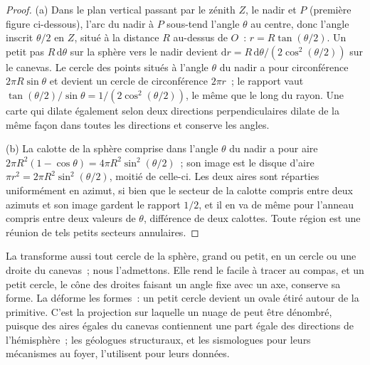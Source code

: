 \begin{proof}
(a) Dans le plan vertical passant par le zénith $Z$, le nadir et $P$
(première figure ci-dessous), l'arc du nadir à $P$
sous-tend l'angle $\theta$ au centre, donc l'angle inscrit
$\theta/2$ en $Z$, situé à la distance $R$ au-dessus de $O$~: $r =
R\tan(\theta/2)$. Un petit pas $R\,\mathrm d\theta$ sur la sphère vers le
nadir devient $\mathrm dr = R\,\mathrm d\theta/(2\cos^2(\theta/2))$ sur le
canevas. Le cercle des points situés à l'angle $\theta$ du nadir a
pour circonférence $2\pi R\sin\theta$ et devient un cercle de circonférence $2\pi
r$~; le rapport vaut $\tan(\theta/2)/\sin\theta = 1/(2\cos^2(\theta/2))$, le même
que le long du rayon. Une carte qui dilate également selon deux directions perpendiculaires
dilate de la même façon dans toutes les directions et conserve les angles.

(b) La calotte de la sphère comprise dans l'angle $\theta$ du nadir a pour aire
$2\pi R^2(1 - \cos\theta) = 4\pi R^2\sin^2(\theta/2)$~; son image est le disque
d'aire $\pi r^2 = 2\pi R^2\sin^2(\theta/2)$, moitié de celle-ci. Les deux aires sont
réparties uniformément en azimut, si bien que le secteur de la calotte compris entre deux azimuts
et son image gardent le rapport $1/2$, et il en va de même pour l'anneau compris entre deux valeurs
de $\theta$, différence de deux calottes. Toute région est une réunion de tels
petits secteurs annulaires.
\end{proof}

La  transforme aussi tout cercle de la sphère, grand ou
petit, en un cercle ou une droite du canevas~; nous l'admettons. Elle rend le
 facile à tracer au compas, et un petit cercle, le cône des
droites faisant un angle fixe avec un axe, conserve sa forme. La 
déforme les formes~: un petit cercle devient un ovale étiré
autour de la primitive. C'est la projection sur laquelle un nuage de  peut être
dénombré, puisque des aires égales du canevas contiennent une part égale des
directions de l'hémisphère~; les géologues structuraux, et les sismologues pour leurs
mécanismes au foyer, l'utilisent pour leurs données.

